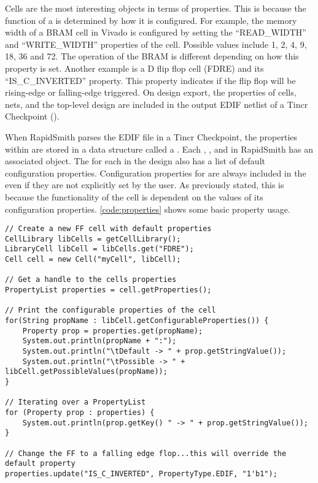 \noindent Cells are the most interesting objects
in terms of properties. This is because the function of a  is
determined by how it is configured. For example, the memory width of a BRAM cell
in Vivado is configured by setting the ``READ\_WIDTH'' and ``WRITE\_WIDTH''
properties of the cell. Possible values include 1, 2, 4, 9, 18, 36 and 72. The
operation of the BRAM is different depending on how this property is set. Another example is
a D flip flop cell (FDRE) and its ``IS\_C\_INVERTED'' property. This property
indicates if the flip flop will be rising-edge or falling-edge triggered. On
design export, the properties of cells, nets, and the top-level design are
included in the output EDIF netlist of a Tincr Checkpoint ().

When RapidSmith parses the EDIF file in a Tincr Checkpoint, the properties
within are stored in a data structure called a . Each
, , and  in RapidSmith has an associated
 object. The  for each \cell in the design
also has a list of default configuration properties. Configuration properties
for \cells are always included in the  even if they are not
explicitly set by the user. As previously stated, this is because the
functionality of the cell is dependent on the values of its configuration
properties. \autoref{code:properties} shows some basic property usage.

\begin{lstlisting}[caption=Using PropertyLists in RapidSmith,
label=code:properties] 
// Create a new FF cell with default properties
CellLibrary libCells = getCellLibrary();
LibraryCell libCell = libCells.get("FDRE");
Cell cell = new Cell("myCell", libCell);

// Get a handle to the cells properties
PropertyList properties = cell.getProperties();

// Print the configurable properties of the cell 
for(String propName : libCell.getConfigurableProperties()) {
	Property prop = properties.get(propName);
	System.out.println(propName + ":");
	System.out.println("\tDefault -> " + prop.getStringValue());
	System.out.println("\tPossible -> " + libCell.getPossibleValues(propName)); 
}

// Iterating over a PropertyList
for (Property prop : properties) {
	System.out.println(prop.getKey() " -> " + prop.getStringValue());
}

// Change the FF to a falling edge flop...this will override the default property 
properties.update("IS_C_INVERTED", PropertyType.EDIF, "1'b1");


\end{lstlisting}

